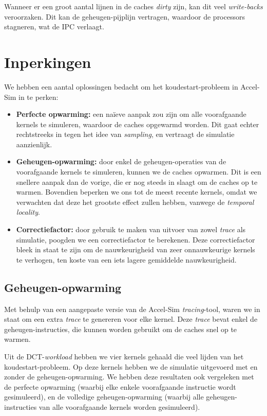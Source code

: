 \documentclass[5p,numvwe]{elsarticle}
\begin{document}
    Wanneer er een groot aantal lijnen in de caches \textit{dirty} zijn, kan dit veel \textit{write-backs} veroorzaken.
    Dit kan de geheugen-pijplijn vertragen, waardoor de processors stagneren, wat de IPC verlaagt.

    \section{Inperkingen}\label{sec:inperking}
    We hebben een aantal oplossingen bedacht om het koudestart-probleem in Accel-Sim in te perken:
    \begin{itemize}
        \item \textbf{Perfecte opwarming:} een naïeve aanpak zou zijn om alle voorafgaande kernels te simuleren, waardoor de caches opgewarmd worden.
        Dit gaat echter rechtstreeks in tegen het idee van \textit{sampling}, en vertraagt de simulatie aanzienlijk.
        \item \textbf{Geheugen-opwarming:} door enkel de geheugen-operaties van de voorafgaande kernels te simuleren, kunnen we de caches opwarmen.
        Dit is een snellere aanpak dan de vorige, die er nog steeds in slaagt om de caches op te warmen.
        Bovendien beperken we ons tot de meest recente kernels, omdat we verwachten dat deze het grootste effect zullen hebben, vanwege de \textit{temporal locality}.
        \item \textbf{Correctiefactor:} door gebruik te maken van uitvoer van zowel \textit{trace} als simulatie, poogden we een correctiefactor te berekenen.
        Deze correctiefactor bleek in staat te zijn om de nauwkeurigheid van zeer onnauwkeurige kernels te verhogen, ten koste van een iets lagere gemiddelde nauwkeurigheid.
    \end{itemize}

    \subsection{Geheugen-opwarming}\label{subsec:inp-mem}
    Met behulp van een aangepaste versie van de Accel-Sim \textit{tracing}-tool, waren we in staat om een extra \textit{trace} te genereren voor elke kernel.
    Deze \textit{trace} bevat enkel de geheugen-instructies, die kunnen worden gebruikt om de caches snel op te warmen.

    Uit de DCT-\textit{workload} hebben we vier kernels gehaald die veel lijden van het koudestart-probleem.
    Op deze kernels hebben we de simulatie uitgevoerd met en zonder de geheugen-opwarming.
    We hebben deze resultaten ook vergeleken met de perfecte opwarming (waarbij elke enkele voorafgaande instructie wordt gesimuleerd), en de volledige geheugen-opwarming (waarbij alle geheugen-instructies van alle voorafgaande kernels worden gesimuleerd).
\end{document}
